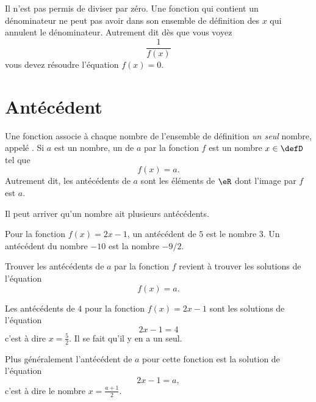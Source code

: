 \begin{Aretenir}        \label{ArtJgipNt}
    Il n'est pas permis de diviser par zéro. Une fonction qui contient un dénominateur ne peut pas avoir dans son ensemble de définition des \( x\) qui annulent le dénominateur. Autrement dit dès que vous voyez
    \begin{equation}
        \frac{1}{ f(x) }
    \end{equation}
    vous devez résoudre l'équation \( f(x)=0\).
\end{Aretenir}

\section{Antécédent}

\begin{Aretenir}
Une fonction associe à chaque nombre de l'ensemble de définition \emph{un seul} nombre, appelé . Si \( a\) est un nombre, un  de \( a\) par la fonction \( f\) est un nombre \( x\in\defD\) tel que 
\begin{equation}
    f(x)=a.
\end{equation}
Autrement dit, les antécédents de \( a\) sont les éléments de \( \eR\) dont l'image par \( f\) est \( a\).

Il peut arriver qu'un nombre ait plusieurs antécédents.
\end{Aretenir}


\begin{example}
    Pour la fonction \( f(x)=2x-1\), un antécédent de \( 5\) est le nombre \( 3\). Un antécédent du nombre \( -10\) est la nombre \( -9/2\).
\end{example}

\begin{Aretenir}
    Trouver les antécédents de \( a\) par la fonction \( f\) revient à trouver les solutions de l'équation
    \begin{equation}
        f(x)=a.
    \end{equation}
\end{Aretenir}


\begin{example}

    Les antécédents de \( 4\) pour la fonction \( f(x)=2x-1\) sont les solutions de l'équation
    \begin{equation}
        2x-1=4
    \end{equation}
    c'est à dire \( x=\frac{ 5 }{2}\). Il se fait qu'il y en a un seul.

    Plus généralement l'antécédent de \( a\) pour cette fonction est la solution de l'équation
    \begin{equation}
        2x-1=a,
    \end{equation}
    c'est à dire le nombre \( x=\frac{ a+1 }{ 2 }\).
\end{example}

